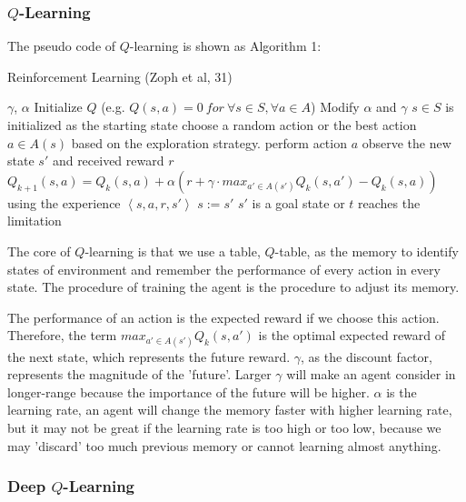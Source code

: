 \documentclass[12pt]{article}
\begin{document}
\subsubsection{$Q$-Learning}
The pseudo code of $Q$-learning is shown as Algorithm 1:
\begin{algorithm}
    \caption{Reinforcement Learning (Zoph et al, 31) }\label{euclid}
    \begin{algorithmic}[1]
    \Require $\gamma$, $\alpha$
    \State Initialize $Q$ (e.g. $Q(s,a) = 0 \ for \ \forall s \in S, \forall a \in A$)
        \State Modify $\alpha$ and $\gamma$
        \State $s \in S$ is initialized as the starting state
        \Repeat
            \State choose a random action or the best action $a \in A(s)$ based on the exploration strategy.
            \State perform action $a$
            \State observe the new state $s'$ and received reward $r$
            \State \small $Q_{k+1}(s, a) = Q_{k}(s, a) + \alpha(r + \gamma \cdot max_{a' \in A(s')}Q_k(s,a') - Q_k(s, a))$
            \State using the experience $\left\langle s,a,r,s'\right\rangle $
            \State $s := s'$
        \Until $s'$ is a goal state or $t$ reaches the limitation
    \EndFor
    \end{algorithmic}
\end{algorithm}

The core of $Q$-learning is that we use a table, $Q$-table, as the memory to identify states of environment and remember the performance of every action in every state. The procedure of training the agent is the procedure to adjust its memory.

The performance of an action is the expected reward if we choose this action. Therefore, the term $max_{a'\in A(s')}Q_k(s,a')$ is the optimal expected reward of the next state, which represents the future reward. $\gamma$, as the discount factor, represents the magnitude of the 'future'. Larger $\gamma$ will make an agent consider in longer-range because the importance of the future will be higher. $\alpha$ is the learning rate, an agent will change the memory faster with higher learning rate, but it may not be great if the learning rate is too high or too low, because we may 'discard' too much previous memory or cannot learning almost anything.

\subsubsection{Deep $Q$-Learning}
\end{document}
